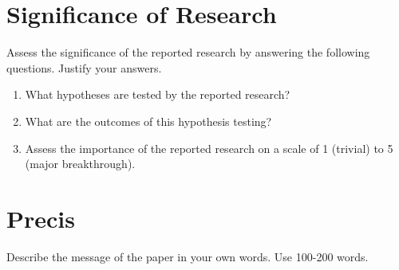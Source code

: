 \section{Significance of Research}
Assess the significance of the reported research by answering the
following questions. Justify your answers.
\begin{enumerate}

\item   What hypotheses are tested by the reported research? \\
\framebox[6.45in][l]{\raisebox{0.15in}[0in][1.0in]{}}

\item   What are the outcomes of this hypothesis testing? \\
\framebox[6.45in][l]{\raisebox{0.15in}[0in][0.75in]{}}

\item   Assess the importance of the reported research on a scale of 1
(trivial) to 5 (major breakthrough).  \\
\framebox[6.45in][l]{\raisebox{0.15in}[0in][0.75in]{}}
\end{enumerate}


\section{Precis}
Describe the message of the paper in your own words. Use 100-200
words. \\
\framebox[6.8in][l]{\raisebox{0.15in}[0in][2.5in]{}}



